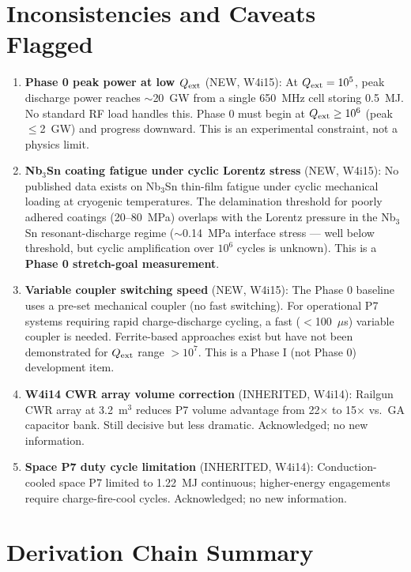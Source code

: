 \documentclass[11pt]{article}
\begin{document}
\section{Inconsistencies and Caveats Flagged}

\begin{enumerate}
\item \textbf{Phase 0 peak power at low $Q_{\rm ext}$} (NEW, W4i15):
  At $Q_{\rm ext} = 10^5$, peak discharge power reaches $\sim$20~GW
  from a single 650~MHz cell storing 0.5~MJ. No standard RF load
  handles this. Phase 0 must begin at $Q_{\rm ext} \geq 10^6$
  (peak $\leq$2~GW) and progress downward. This is an experimental
  constraint, not a physics limit.

\item \textbf{Nb$_3$Sn coating fatigue under cyclic Lorentz stress}
  (NEW, W4i15): No published data exists on Nb$_3$Sn thin-film
  fatigue under cyclic mechanical loading at cryogenic temperatures.
  The delamination threshold for poorly adhered coatings
  (20--80~MPa) overlaps with the Lorentz pressure in the Nb$_3$Sn
  resonant-discharge regime ($\sim$0.14~MPa interface stress ---
  well below threshold, but cyclic amplification over $10^6$ cycles
  is unknown). This is a \textbf{Phase 0 stretch-goal measurement}.

\item \textbf{Variable coupler switching speed} (NEW, W4i15):
  The Phase 0 baseline uses a pre-set mechanical coupler (no fast
  switching). For operational P7 systems requiring rapid
  charge-discharge cycling, a fast ($<$100~$\mu$s) variable coupler
  is needed. Ferrite-based approaches exist but have not been
  demonstrated for $Q_{\rm ext}$ range $>10^7$. This is a
  Phase I (not Phase 0) development item.

\item \textbf{W4i14 CWR array volume correction} (INHERITED, W4i14):
  Railgun CWR array at 3.2~m$^3$ reduces P7 volume advantage
  from 22$\times$ to 15$\times$ vs.\ GA capacitor bank. Still
  decisive but less dramatic. Acknowledged; no new information.

\item \textbf{Space P7 duty cycle limitation} (INHERITED, W4i14):
  Conduction-cooled space P7 limited to 1.22~MJ continuous;
  higher-energy engagements require charge-fire-cool cycles.
  Acknowledged; no new information.
\end{enumerate}

\section{Derivation Chain Summary}
\end{document}
